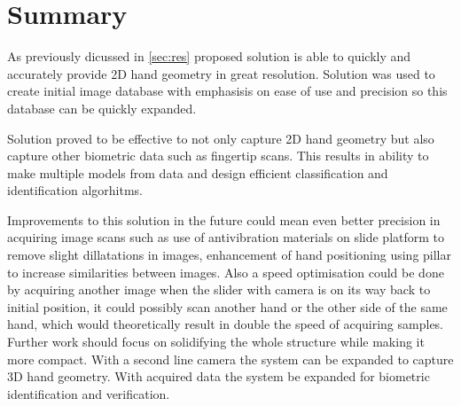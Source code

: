 \documentclass[11pt,a4paper]{article}
\begin{document}
\section{Summary}
\label{sec:sum}
As previously dicussed in \ref{sec:res} proposed solution is able to quickly and accurately provide 2D hand geometry in great resolution. Solution was
used to create initial image database with emphasisis on ease of use and precision so this database can be quickly expanded.

Solution proved to be effective to not only capture 2D hand geometry but also capture other biometric data such as fingertip scans. This results in
ability to make multiple models from data and design efficient classification and identification algorhitms.

Improvements to this solution in the future could mean even better precision in acquiring image scans such as use of antivibration materials on
slide platform to remove slight dillatations in images, enhancement of hand positioning using pillar to increase similarities between images.
Also a speed optimisation could be done by acquiring another image when the slider with camera is on its way back to initial position, it could possibly scan another hand or the other
side of the same hand, which would theoretically result in double the speed of acquiring samples.
Further work should focus on solidifying the whole structure while making it more compact.
With a second line camera the system can be expanded to capture 3D hand geometry. With acquired data the system be expanded for biometric identification and verification.
\end{document}
